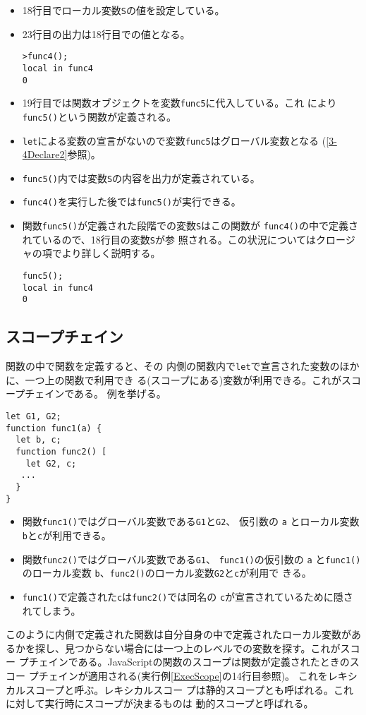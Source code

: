 \begin{itemize}
\begin{itemize}
 \item 18行目でローカル変数\Verb+S+の値を設定している。
 \item 23行目の出力は18行目での値となる。
\begin{Verbatim}
>func4();
local in func4
0
\end{Verbatim}
 \item 19行目では関数オブジェクトを変数\Verb+func5+に代入している。これ
       により\Verb+func5()+という関数が定義される。
 \item \Verb+let+による変数の宣言がないので変数\Verb+func5+はグローバル変数となる
       (\ref{3-4Declare2}参照)。
 \item \Verb+func5()+内では変数\Verb+S+の内容を出力が定義されている。
 \item \Verb+func4()+を実行した後では\Verb+func5()+が実行できる。
 \item 関数\Verb+func5()+が定義された段階での変数\Verb+S+はこの関数が
       \Verb+func4()+の中で定義されているので、18行目の変数\Verb+S+が参
       照される。この状況についてはクロージャの項でより詳しく説明する。
\begin{Verbatim}
func5();
local in func4
0
\end{Verbatim}
\end{itemize}
\end{itemize}

\subsection{スコープチェイン}
関数の中で関数を定義すると、その
内側の関数内で\Verb+let+で宣言された変数のほかに、一つ上の関数で利用でき
る(スコープにある)変数が利用できる。これがスコープチェインである。
例を挙げる。
\begin{Verbatim}
let G1, G2;
function func1(a) {
  let b, c;
  function func2() [
    let G2, c;
   ...
  }
}
\end{Verbatim}
\begin{itemize}
 \item 関数\Verb+func1()+ではグローバル変数である\Verb+G1+と\Verb+G2+、
       仮引数の \Verb+a+ とローカル変数\Verb+b+と\Verb+c+が利用できる。
 \item 関数\Verb+func2()+ではグローバル変数である\Verb+G1+、
       \Verb+func1()+の仮引数の \Verb+a+ と\Verb+func1()+のローカル変数
       \Verb+b+、\Verb+func2()+のローカル変数\Verb+G2+と\Verb+c+が利用で
       きる。
 \item \Verb+func1()+で定義された\Verb+c+は\Verb+func2()+では同名の
       \Verb+c+が宣言されているために隠されてしまう。
\end{itemize}
このように内側で定義された関数は自分自身の中で定義されたローカル変数があ
るかを探し、見つからない場合には一つ上のレベルでの変数を探す。これがスコー
プチェインである。JavaScriptの関数のスコープは関数が定義されたときのスコー
プチェインが適用される(実行例\ref{ExecScope}の14行目参照)。
これをレキシカルスコープと呼ぶ。レキシカルスコー
プは静的スコープとも呼ばれる。これに対して実行時にスコープが決まるものは
動的スコープと呼ばれる。
